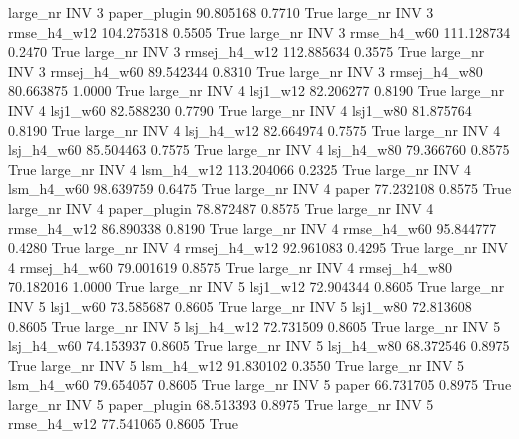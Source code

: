   large_nr      INV                 3 paper_plugin   90.805168      0.7710    True
  large_nr      INV                 3  rmse_h4_w12  104.275318      0.5505    True
  large_nr      INV                 3  rmse_h4_w60  111.128734      0.2470    True
  large_nr      INV                 3 rmsej_h4_w12  112.885634      0.3575    True
  large_nr      INV                 3 rmsej_h4_w60   89.542344      0.8310    True
  large_nr      INV                 3 rmsej_h4_w80   80.663875      1.0000    True
  large_nr      INV                 4     lsj1_w12   82.206277      0.8190    True
  large_nr      INV                 4     lsj1_w60   82.588230      0.7790    True
  large_nr      INV                 4     lsj1_w80   81.875764      0.8190    True
  large_nr      INV                 4   lsj_h4_w12   82.664974      0.7575    True
  large_nr      INV                 4   lsj_h4_w60   85.504463      0.7575    True
  large_nr      INV                 4   lsj_h4_w80   79.366760      0.8575    True
  large_nr      INV                 4   lsm_h4_w12  113.204066      0.2325    True
  large_nr      INV                 4   lsm_h4_w60   98.639759      0.6475    True
  large_nr      INV                 4        paper   77.232108      0.8575    True
  large_nr      INV                 4 paper_plugin   78.872487      0.8575    True
  large_nr      INV                 4  rmse_h4_w12   86.890338      0.8190    True
  large_nr      INV                 4  rmse_h4_w60   95.844777      0.4280    True
  large_nr      INV                 4 rmsej_h4_w12   92.961083      0.4295    True
  large_nr      INV                 4 rmsej_h4_w60   79.001619      0.8575    True
  large_nr      INV                 4 rmsej_h4_w80   70.182016      1.0000    True
  large_nr      INV                 5     lsj1_w12   72.904344      0.8605    True
  large_nr      INV                 5     lsj1_w60   73.585687      0.8605    True
  large_nr      INV                 5     lsj1_w80   72.813608      0.8605    True
  large_nr      INV                 5   lsj_h4_w12   72.731509      0.8605    True
  large_nr      INV                 5   lsj_h4_w60   74.153937      0.8605    True
  large_nr      INV                 5   lsj_h4_w80   68.372546      0.8975    True
  large_nr      INV                 5   lsm_h4_w12   91.830102      0.3550    True
  large_nr      INV                 5   lsm_h4_w60   79.654057      0.8605    True
  large_nr      INV                 5        paper   66.731705      0.8975    True
  large_nr      INV                 5 paper_plugin   68.513393      0.8975    True
  large_nr      INV                 5  rmse_h4_w12   77.541065      0.8605    True
